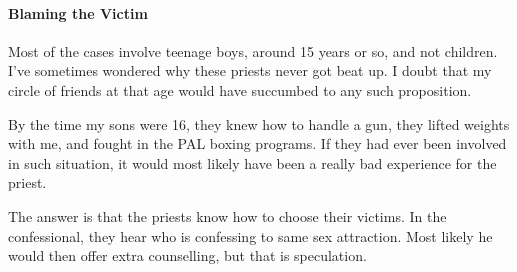 \paragraph{Blaming the Victim}
Most of the cases involve teenage boys, around 15 years or so, and not children. I've sometimes
wondered why these priests never got beat up. I doubt that my circle of friends at that age would have succumbed to any
such proposition.

By the time my sons were 16, they knew how to handle a gun, they lifted weights with me, and fought in the PAL boxing
programs. If they had ever been involved in such situation, it would most likely have been a really bad experience for
the priest.

The answer is that the priests know how to choose their victims. In the confessional, they hear who is confessing to
same sex attraction. Most likely he would then offer extra counselling, but that is speculation.




